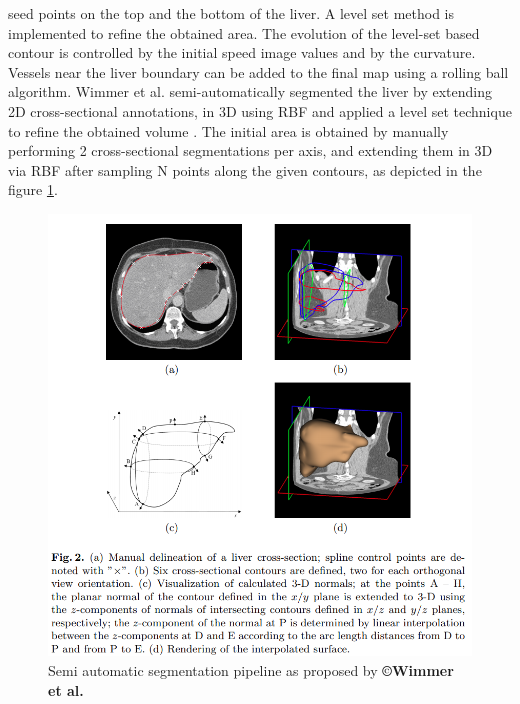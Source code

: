 \documentclass[]{article}
\begin{document}
	seed points on the top and the bottom of the liver. A level set method
	is implemented to refine the obtained area. The evolution of the
	level-set based contour is controlled by the initial speed image values
	and by the curvature. Vessels near the liver boundary can be added to
	the final map using a rolling ball algorithm.
	Wimmer et al. semi-automatically segmented the liver by extending 2D
	cross-sectional annotations, in 3D using RBF and applied a level set
	technique to refine the obtained volume \cite{Wimmer2007}. The initial area is obtained by
	manually performing 2 cross-sectional segmentations per axis, and
	extending them in 3D via RBF after sampling N points along the given
	contours, as depicted in the figure \ref{Wimmer2007_Fig2}.
	
	
	\begin{figure} [ht!]
		\centering
		\includegraphics[width=0.5\linewidth]{images/image8}
		\caption{Semi automatic segmentation pipeline as proposed by \textbf{©Wimmer et al.} \cite{Wimmer2007}}
		\label{Wimmer2007_Fig2}
	\end{figure}
	
\end{document}

